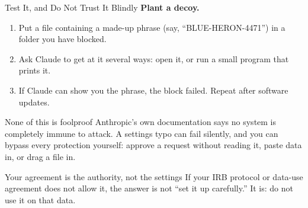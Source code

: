 \documentclass[aspectratio=169, 11pt]{beamer}
\begin{document}
\begin{frame}{Test It, and Do Not Trust It Blindly}
  \textbf{Plant a decoy.}\vspace{-0.3em}
  \begin{enumerate}
    \item Put a file containing a made-up phrase (say, ``BLUE-HERON-4471'') in a folder you have blocked.
    \item Ask Claude to get at it several ways: open it, or run a small program that prints it.
    \item If Claude can show you the phrase, the block failed. Repeat after software updates.
  \end{enumerate}

  \vspace{0.4em}
  \begin{alertblock}{None of this is foolproof}
    Anthropic's own documentation says no system is completely immune to attack. A settings typo can fail silently, and you can bypass every protection yourself: approve a request without reading it, paste data in, or drag a file in.
  \end{alertblock}

  \vspace{0.4em}
  \begin{block}{Your agreement is the authority, not the settings}
    If your IRB protocol or data-use agreement does not allow it, the answer is not ``set it up carefully.'' It is: do not use it on that data.
  \end{block}
\end{frame}

\end{document}
